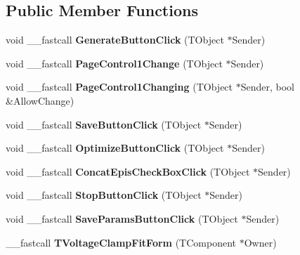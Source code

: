 \subsection*{Public Member Functions}
\begin{DoxyCompactItemize}
\item 
\hypertarget{class_t_voltage_clamp_fit_form_ab311a8df380c5f68e2fd660bb6156ef5}{void \+\_\+\+\_\+fastcall {\bfseries Generate\+Button\+Click} (T\+Object $\ast$Sender)}\label{class_t_voltage_clamp_fit_form_ab311a8df380c5f68e2fd660bb6156ef5}

\item 
\hypertarget{class_t_voltage_clamp_fit_form_adfa1a7e8c3e4b8642a0669a315887800}{void \+\_\+\+\_\+fastcall {\bfseries Page\+Control1\+Change} (T\+Object $\ast$Sender)}\label{class_t_voltage_clamp_fit_form_adfa1a7e8c3e4b8642a0669a315887800}

\item 
\hypertarget{class_t_voltage_clamp_fit_form_a9918726cc0ce4232e90dc2ab1f4d2ce4}{void \+\_\+\+\_\+fastcall {\bfseries Page\+Control1\+Changing} (T\+Object $\ast$Sender, bool \&Allow\+Change)}\label{class_t_voltage_clamp_fit_form_a9918726cc0ce4232e90dc2ab1f4d2ce4}

\item 
\hypertarget{class_t_voltage_clamp_fit_form_af093532ff4a4697be6e434fea9dec69c}{void \+\_\+\+\_\+fastcall {\bfseries Save\+Button\+Click} (T\+Object $\ast$Sender)}\label{class_t_voltage_clamp_fit_form_af093532ff4a4697be6e434fea9dec69c}

\item 
\hypertarget{class_t_voltage_clamp_fit_form_a378d81bf328b187863b11b6cad483698}{void \+\_\+\+\_\+fastcall {\bfseries Optimize\+Button\+Click} (T\+Object $\ast$Sender)}\label{class_t_voltage_clamp_fit_form_a378d81bf328b187863b11b6cad483698}

\item 
\hypertarget{class_t_voltage_clamp_fit_form_adab7fb8bb583005aeb5eca825fede65a}{void \+\_\+\+\_\+fastcall {\bfseries Concat\+Epis\+Check\+Box\+Click} (T\+Object $\ast$Sender)}\label{class_t_voltage_clamp_fit_form_adab7fb8bb583005aeb5eca825fede65a}

\item 
\hypertarget{class_t_voltage_clamp_fit_form_a9494d3416cc211e991604ecfc1fda948}{void \+\_\+\+\_\+fastcall {\bfseries Stop\+Button\+Click} (T\+Object $\ast$Sender)}\label{class_t_voltage_clamp_fit_form_a9494d3416cc211e991604ecfc1fda948}

\item 
\hypertarget{class_t_voltage_clamp_fit_form_a4c0da415929e12474485a65b569bac3c}{void \+\_\+\+\_\+fastcall {\bfseries Save\+Params\+Button\+Click} (T\+Object $\ast$Sender)}\label{class_t_voltage_clamp_fit_form_a4c0da415929e12474485a65b569bac3c}

\item 
\hypertarget{class_t_voltage_clamp_fit_form_a4f9bac2baf8d674ee8c159b1c539c4ab}{\+\_\+\+\_\+fastcall {\bfseries T\+Voltage\+Clamp\+Fit\+Form} (T\+Component $\ast$Owner)}\label{class_t_voltage_clamp_fit_form_a4f9bac2baf8d674ee8c159b1c539c4ab}

\end{DoxyCompactItemize}
